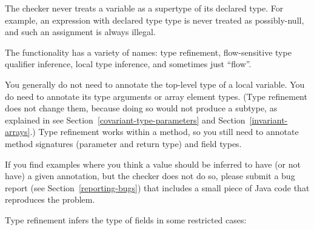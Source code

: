 The checker never treats a variable as
a supertype of its declared type.  For example, an expression with declared type 
type is never treated as possibly-null, and such an assignment is always illegal.

The functionality has a variety of names:  type refinement,
flow-sensitive type qualifier inference, local type inference, and
sometimes just ``flow''.



You generally do not need to annotate the top-level type of a local variable.
You do need to annotate its type arguments or array element types.
(Type refinement does not change them, because doing so would not produce a
subtype, as explained in see Section~\ref{covariant-type-parameters} and
Section~\ref{invariant-arrays}.)
Type refinement works within a method, so you still need to
annotate method signatures (parameter and return type) and field types.

If you find examples where you think a value should be inferred to have
(or not have) a
given annotation, but the checker does not do so, please submit a bug
report (see Section~\ref{reporting-bugs}) that includes a small piece of
Java code that reproduces the problem.



Type refinement infers the type of fields in some restricted cases:

